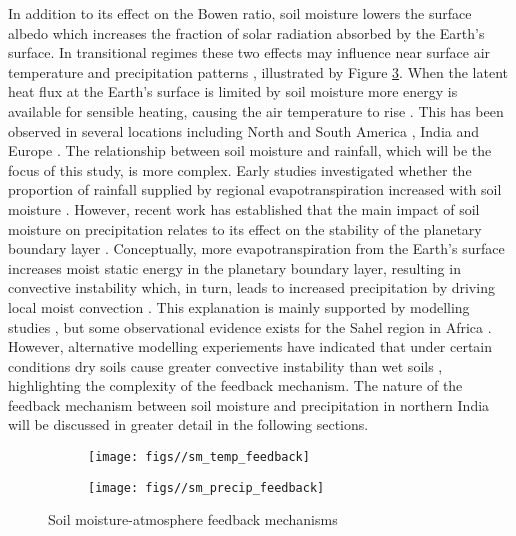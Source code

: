 \documentclass{icldt}\usepackage[]{graphicx}\usepackage[]{color}
\begin{document}
In addition to its effect on the Bowen ratio, soil moisture lowers the surface albedo which increases the fraction of solar radiation absorbed by the Earth's surface. In transitional regimes these two effects may influence near surface air temperature and precipitation patterns \citep{Seneviratne2010}, illustrated by Figure \ref{fig:feedbacks}. When the latent heat flux at the Earth's surface is limited by soil moisture more energy is available for sensible heating, causing the air temperature to rise \citep{Seneviratne2010}. This has been observed in several locations including North and South America \citep[e.g.][]{Clark2005}, India \citep[e.g.][]{Roy2007} and Europe \citep[e.g.][]{Seneviratne2006}. The relationship between soil moisture and rainfall, which will be the focus of this study, is more complex. Early studies investigated whether the proportion of rainfall supplied by regional evapotranspiration increased with soil moisture \citep[e.g.][]{Eltahir1996,Trenberth1999}. However, recent work has established that the main impact of soil moisture on precipitation relates to its effect on the stability of the planetary boundary layer \citep[e.g.][]{Eltahir1998,Findell2003a,Findell2003b,Alfieri2008,Lo2013}. Conceptually, more evapotranspiration from the Earth's surface increases moist static energy in the planetary boundary layer, resulting in convective instability which, in turn, leads to increased precipitation by driving local moist convection \citep{Eltahir1998}. This explanation is mainly supported by modelling studies \citep[e.g.][]{Zheng1998,Koster2004,Lo2013}, but some observational evidence exists for the Sahel region in Africa \citep{Taylor2006,Taylor2007}. However, alternative modelling experiements have indicated that under certain conditions dry soils cause greater convective instability than wet soils \citep[e.g.][]{Findell2003,Findell2003b}, highlighting the complexity of the feedback mechanism. The nature of the feedback mechanism between soil moisture and precipitation in northern India will be discussed in greater detail in the following sections. \\

\begin{figure}[h]
\centering
\begin{subfigure}[h]{.5\textwidth}
    \centering
    \texttt{[image: figs//sm\_temp\_feedback]}
    \label{fig:sm_temp_feedback}
\end{subfigure}%
\begin{subfigure}[h]{.5\textwidth}
    \centering
    \texttt{[image: figs//sm\_precip\_feedback]}
    \label{fig:sm_precip_feedback}
\end{subfigure}
\caption[Soil moisture-atmosphere feedback mechanisms]{Soil moisture-atmosphere feedback mechanisms \citep{Seneviratne2010}}
\label{fig:feedbacks}
\end{figure}
\end{document}

